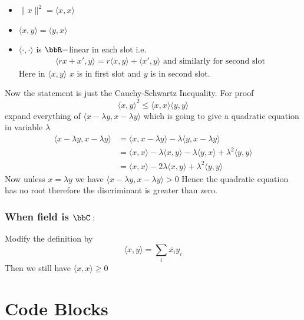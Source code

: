 \documentclass{report}
\begin{document}
{	\begin{note}
		\begin{itemize}
			\item $\|x\|^2=\langle x,x\rangle$
			\item $\langle x,y\rangle=\langle y,x\rangle$
			\item $\langle \cdot,\cdot\rangle$ is $\bbR-$linear in each slot i.e. \begin{align*}
				      \langle rx+x',y\rangle=r\langle x,y\rangle+\langle x',y\rangle	\text{ and similarly for second slot}
			      \end{align*}Here in $\langle x,y\rangle$ $x$ is in first slot and $y$ is in second slot.
		\end{itemize}
	\end{note}Now the statement is just the Cauchy-Schwartz Inequality. For proof $$\langle x,y\rangle^2\leq \langle x,x\rangle\langle y,y\rangle $$ expand everything of $\langle x-\lambda y,x-\lambda y\rangle$ which is going to give a quadratic equation in variable $\lambda $ \begin{align*}
		\langle x-\lambda y,x-\lambda y\rangle & =\langle x,x-\lambda y\rangle-\lambda\langle y,x-\lambda y\rangle                                       \\
		                                       & =\langle x ,x\rangle -\lambda\langle x,y\rangle -\lambda\langle y,x\rangle +\lambda^2\langle y,y\rangle \\
		                                       & =\langle x,x\rangle -2\lambda\langle x,y\rangle+\lambda^2\langle y,y\rangle
	\end{align*}Now unless $x=\lambda y$ we have $\langle x-\lambda y,x-\lambda y\rangle>0$ Hence the quadratic equation has no root therefore the discriminant is greater than zero.

	\subsubsection*{\textbf{When field is $\bbC:$}}Modify the definition by $$\langle x,y\rangle=\sum_i\overline{x_i}y_i$$Then we still have $\langle x,x\rangle\geq 0$}

\newpage
\section{Code Blocks}
\end{document}

